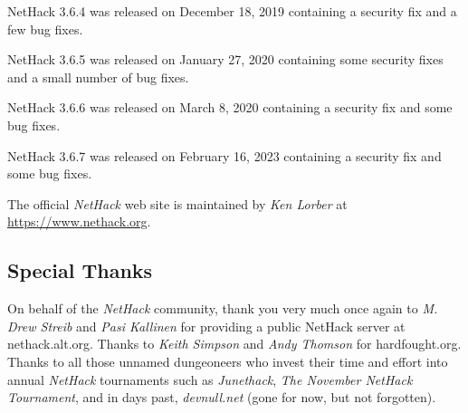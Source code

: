 \documentclass[titlepage]{article}
\begin{document}
\medskip
NetHack 3.6.4 was released on December 18, 2019 containing a security fix and
a few bug fixes.

\medskip
NetHack 3.6.5 was released on January 27, 2020 containing some security fixes
and a small number of bug fixes.

\medskip
NetHack 3.6.6 was released on March 8, 2020 containing a security fix and
some bug fixes.

\medskip
NetHack 3.6.7 was released on February 16, 2023 containing a security fix and
some bug fixes.

\medskip
\noindent The official \textit{NetHack} web site is maintained by \textit{Ken Lorber} at
\url{https://www.nethack.org}.


\subsection*{Special Thanks}
\noindent On behalf of the \textit{NetHack} community, thank you very much once
again to \textit{M. Drew Streib} and \textit{Pasi Kallinen} for providing a
public NetHack server at nethack.alt.org. Thanks to \textit{Keith Simpson}
and \textit{Andy Thomson} for hardfought.org. Thanks to all those
unnamed dungeoneers who invest their time and effort into annual
\textit{NetHack} tournaments such as \textit{Junethack},
\textit{The November NetHack Tournament}, and in days past,
\textit{devnull.net} (gone for now, but not forgotten).
\clearpage

\end{document}

